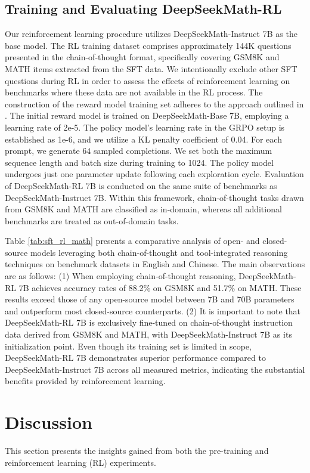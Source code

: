 \begin{itemize}[topsep=0pt]
\subsection{Training and Evaluating DeepSeekMath-RL}

Our reinforcement learning procedure utilizes DeepSeekMath-Instruct 7B as the base model. The RL training dataset comprises approximately 144K questions presented in the chain-of-thought format, specifically covering GSM8K and MATH items extracted from the SFT data. We intentionally exclude other SFT questions during RL in order to assess the effects of reinforcement learning on benchmarks where these data are not available in the RL process. The construction of the reward model training set adheres to the approach outlined in \citep{wang2023math}. The initial reward model is trained on DeepSeekMath-Base 7B, employing a learning rate of 2e-5. The policy model's learning rate in the GRPO setup is established as 1e-6, and we utilize a KL penalty coefficient of 0.04. For each prompt, we generate $64$ sampled completions. We set both the maximum sequence length and batch size during training to 1024. The policy model undergoes just one parameter update following each exploration cycle. Evaluation of DeepSeekMath-RL 7B is conducted on the same suite of benchmarks as DeepSeekMath-Instruct 7B. Within this framework, chain-of-thought tasks drawn from GSM8K and MATH are classified as in-domain, whereas all additional benchmarks are treated as out-of-domain tasks.

Table \ref{tab:sft_rl_math} presents a comparative analysis of open- and closed-source models leveraging both chain-of-thought and tool-integrated reasoning techniques on benchmark datasets in English and Chinese. The main observations are as follows: (1) When employing chain-of-thought reasoning, DeepSeekMath-RL 7B achieves accuracy rates of 88.2\% on GSM8K and 51.7\% on MATH. These results exceed those of any open-source model between 7B and 70B parameters and outperform most closed-source counterparts. (2) It is important to note that DeepSeekMath-RL 7B is exclusively fine-tuned on chain-of-thought instruction data derived from GSM8K and MATH, with DeepSeekMath-Instruct 7B as its initialization point. Even though its training set is limited in scope, DeepSeekMath-RL 7B demonstrates superior performance compared to DeepSeekMath-Instruct 7B across all measured metrics, indicating the substantial benefits provided by reinforcement learning.

\section{Discussion}
This section presents the insights gained from both the pre-training and reinforcement learning (RL) experiments.


\end{itemize}
